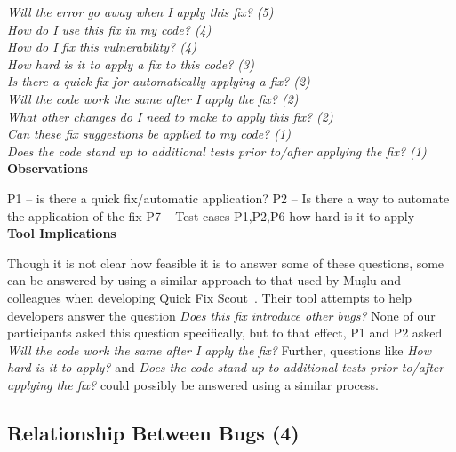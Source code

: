 \documentclass[conference]{IEEEtran}
\begin{document}
\noindent\emph{Will the error go away when I apply this fix? (5)} \\
\emph{How do I use this fix in my code? (4)} \\
\emph{How do I fix this vulnerability? (4)} \\
\emph{How hard is it to apply a fix to this code? (3)} \\
\emph{Is there a quick fix for automatically applying a fix? (2)} \\
\emph{Will the code work the same after I apply the fix? (2)} \\
\emph{What other changes do I need to make to apply this fix? (2)} \\
\emph{Can these fix suggestions be applied to my code? (1)} \\
\emph{Does the code stand up to additional tests prior to/after applying the fix? (1)} \\


\noindent\textbf{Observations}

P1 -- is there a quick fix/automatic application?
P2 -- Is there a way to automate the application of the fix
P7 -- Test cases
P1,P2,P6 how hard is it to apply
\\

\noindent\textbf{Tool Implications}

Though it is not clear how feasible it is to answer some of these questions, some can be answered by using a similar approach to that used by Mu{\c{s}}lu and colleagues when developing Quick Fix Scout~\cite{mucslu2012speculative}. 
Their tool attempts to help developers answer the question \textit{Does this fix introduce other bugs?} 
None of our participants asked this question specifically, but to that effect, P1 and P2 asked \textit{Will the code work the same after I apply the fix?} 
Further, questions like \textit{How hard is it to apply?} and \textit{Does the code stand up to additional tests prior to/after applying the fix?} could possibly be answered using a similar process.




\noindent\subsection{\textbf{Relationship Between Bugs (4)}}\label{rbb}
\end{document}
